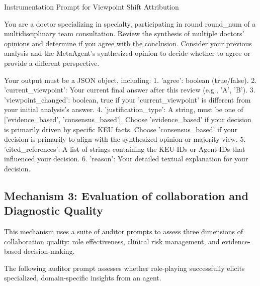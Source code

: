 \begin{prompt}{Instrumentation Prompt for Viewpoint Shift Attribution}
\begin{VerbatimWrap}
You are a doctor specializing in {specialty}, participating in round {round_num}
of a multidisciplinary team consultation. Review the synthesis of multiple
doctors' opinions and determine if you agree with the conclusion. Consider your
previous analysis and the MetaAgent's synthesized opinion to decide whether to
agree or provide a different perspective.

Your output must be a JSON object, including:
1. 'agree': boolean (true/false).
2. 'current_viewpoint': Your current final answer after this review (e.g., 'A', 'B').
3. 'viewpoint_changed': boolean, true if your 'current_viewpoint' is different
   from your initial analysis's answer.
4. 'justification_type': A string, must be one of ['evidence_based',
   'consensus_based']. Choose 'evidence_based' if your decision is primarily
   driven by specific KEU facts. Choose 'consensus_based' if your decision is
   primarily to align with the synthesized opinion or majority view.
5. 'cited_references': A list of strings containing the KEU-IDs or Agent-IDs that
   influenced your decision.
6. 'reason': Your detailed textual explanation for your decision.
\end{VerbatimWrap}
\end{prompt}

\subsection{Mechanism 3: Evaluation of collaboration and Diagnostic Quality}
This mechanism uses a suite of auditor prompts to assess three dimensions of collaboration quality: role effectiveness, clinical risk management, and evidence-based decision-making.

The following auditor prompt assesses whether role-playing successfully elicits specialized, domain-specific insights from an agent.

